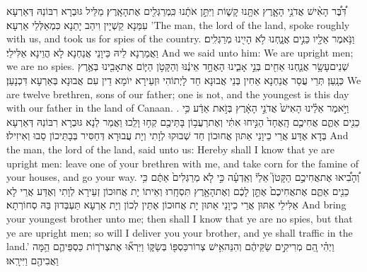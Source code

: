 {דִּ֠בֶּ֠ר הָאִ֨ישׁ אֲדֹנֵ֥י הָאָ֛רֶץ אִתָּ֖נוּ קָשׁ֑וֹת וַיִּתֵּ֣ן אֹתָ֔נוּ כִּֽמְרַגְּלִ֖ים אֶת\maqqaf הָאָֽרֶץ׃}
{מַלֵּיל גּוּבְרָא רִבּוֹנַהּ דְּאַרְעָא עִמַּנָא קַשְׁיָין וִיהַב יָתַנָא כִּמְאַלְּלֵי אַרְעָא׃}
{’The man, the lord of the land, spoke roughly with us, and took us for spies of the country.}{}
{וַנֹּ֥אמֶר אֵלָ֖יו כֵּנִ֣ים אֲנָ֑חְנוּ לֹ֥א הָיִ֖ינוּ מְרַגְּלִֽים׃}
{וַאֲמַרְנָא לֵיהּ כֵּיוָנֵי אֲנַחְנָא לָא הֲוֵינָא אַלִּילֵי׃}
{And we said unto him: We are upright men; we are no spies.}{}
{שְׁנֵים\maqqaf עָשָׂ֥ר אֲנַ֛חְנוּ אַחִ֖ים בְּנֵ֣י אָבִ֑ינוּ הָאֶחָ֣ד אֵינֶ֔נּוּ וְהַקָּטֹ֥ן הַיּ֛וֹם אֶת\maqqaf אָבִ֖ינוּ בְּאֶ֥רֶץ כְּנָֽעַן׃}
{תְּרֵי עֲסַר אֲנַחְנָא אַחִין בְּנֵי אֲבוּנָא חַד לָיְתוֹהִי וּזְעֵירָא יוֹמָא דֵין עִם אֲבוּנָא בְּאַרְעָא דִּכְנָעַן׃}
{We are twelve brethren, sons of our father; one is not, and the youngest is this day with our father in the land of Canaan. .}{}
{וַיֹּ֣אמֶר אֵלֵ֗ינוּ הָאִישׁ֙ אֲדֹנֵ֣י הָאָ֔רֶץ בְּזֹ֣את אֵדַ֔ע כִּ֥י כֵנִ֖ים אַתֶּ֑ם אֲחִיכֶ֤ם הָֽאֶחָד֙ הַנִּ֣יחוּ אִתִּ֔י וְאֶת\maqqaf רַעֲב֥וֹן בָּתֵּיכֶ֖ם קְח֥וּ וָלֵֽכוּ׃}
{וַאֲמַר לַנָא גּוּבְרָא רִבּוֹנַהּ דְּאַרְעָא בְּדָא אֶדַּע אֲרֵי כֵיוָנֵי אַתּוּן אֲחוּכוֹן חַד שְׁבוּקוּ לְוָתִי וְיָת עֲבוּרָא דְּחַסִּיר בְּבָתֵּיכוֹן סַבוּ וְאִיזִילוּ׃}
{And the man, the lord of the land, said unto us: Hereby shall I know that ye are upright men: leave one of your brethren with me, and take corn for the famine of your houses, and go your way.}{}
{וְ֠הָבִ֠יאוּ אֶת\maqqaf אֲחִיכֶ֣ם הַקָּטֹן֮ אֵלַי֒ וְאֵֽדְעָ֗ה כִּ֣י לֹ֤א מְרַגְּלִים֙ אַתֶּ֔ם כִּ֥י כֵנִ֖ים אַתֶּ֑ם אֶת\maqqaf אֲחִיכֶם֙ אֶתֵּ֣ן לָכֶ֔ם וְאֶת\maqqaf הָאָ֖רֶץ תִּסְחָֽרוּ׃}
{וְאֵיתוֹ יָת אֲחוּכוֹן זְעֵירָא לְוָתִי וְאֶדַּע אֲרֵי לָא אַלִּילֵי אַתּוּן אֲרֵי כֵיוָנֵי אַתּוּן יָת אֲחוּכוֹן אֶתֵּין לְכוֹן וְיָת אַרְעָא תַּעְבְּדוּן בַּהּ סְחוֹרְתָא׃}
{And bring your youngest brother unto me; then shall I know that ye are no spies, but that ye are upright men; so will I deliver you your brother, and ye shall traffic in the land.’}{}
{וַיְהִ֗י הֵ֚ם מְרִיקִ֣ים שַׂקֵּיהֶ֔ם וְהִנֵּה\maqqaf אִ֥ישׁ צְרוֹר\maqqaf כַּסְפּ֖וֹ בְּשַׂקּ֑וֹ וַיִּרְא֞וּ אֶת\maqqaf צְרֹר֧וֹת כַּסְפֵּיהֶ֛ם הֵ֥מָּה וַאֲבִיהֶ֖ם וַיִּירָֽאוּ׃}
